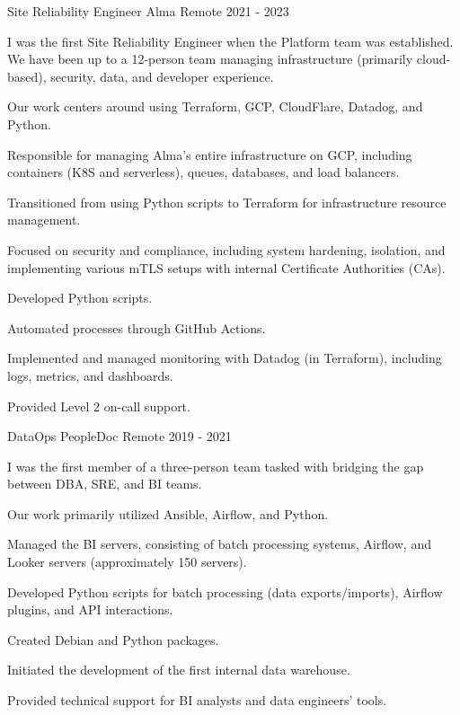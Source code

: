 \begin{cventries}
\cventry
{Site Reliability Engineer} %
{Alma} %
{Remote} %
{2021 - 2023} %
{ %
\begin{cvitems}
\item {I was the first Site Reliability Engineer when the Platform team was established. We have been up to a 12-person team managing infrastructure (primarily cloud-based), security, data, and developer experience.}
\item {Our work centers around using Terraform, GCP, CloudFlare, Datadog, and Python.}
\item {Responsible for managing Alma's entire infrastructure on GCP, including containers (K8S and serverless), queues, databases, and load balancers.}
\item {Transitioned from using Python scripts to Terraform for infrastructure resource management.}
\item {Focused on security and compliance, including system hardening, isolation, and implementing various mTLS setups with internal Certificate Authorities (CAs).}
\item {Developed Python scripts.}
\item {Automated processes through GitHub Actions.}
\item {Implemented and managed monitoring with Datadog (in Terraform), including logs, metrics, and dashboards.}
\item {Provided Level 2 on-call support.}
\end{cvitems}
}


\cventry
{DataOps} %
{PeopleDoc} %
{Remote} %
{2019 - 2021} %
{ %
\begin{cvitems}
\item {I was the first member of a three-person team tasked with bridging the gap between DBA, SRE, and BI teams.}
\item {Our work primarily utilized Ansible, Airflow, and Python.}
\item {Managed the BI servers, consisting of batch processing systems, Airflow, and Looker servers (approximately 150 servers).}
\item {Developed Python scripts for batch processing (data exports/imports), Airflow plugins, and API interactions.}
\item {Created Debian and Python packages.}
\item {Initiated the development of the first internal data warehouse.}
\item {Provided technical support for BI analysts and data engineers' tools.}
\end{cvitems}
}


\end{cventries}

